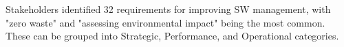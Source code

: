 \documentclass[authoryear,preprint,review,11pt,doubleblind]{elsarticle}
\begin{document}
    Stakeholders identified 32 requirements for improving SW management, with "zero waste" and "assessing environmental impact" being the most common. These can be grouped into Strategic, Performance, and Operational categories.%
\end{document}
